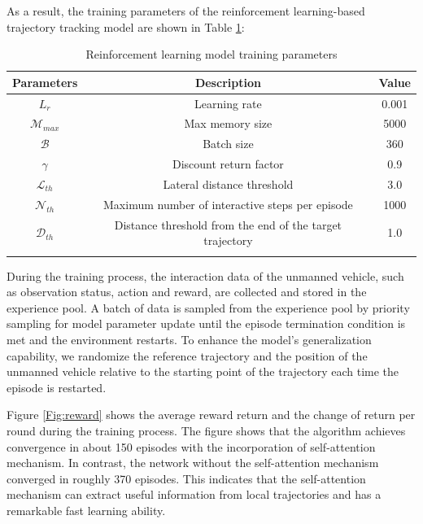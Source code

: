 \documentclass[sn-mathphys]{sn-jnl}%
\theoremstyle{thmstyleone}%
\theoremstyle{thmstyletwo}%
\theoremstyle{thmstylethree}%
\begin{document}
As a result, the training parameters of the reinforcement learning-based trajectory tracking model are shown in Table \ref{tab:train_param}:


\begin{table}[h]
	\begin{center}
		\caption{Reinforcement learning model training parameters}
		\label{tab:train_param}
		\begin{tabular}{ccc}
			\toprule
			Parameters & Description &Value   \\
			\midrule
			$ L_r $  & Learning rate  & 0.001      \\
			$ \mathcal{M}_{max} $ &  Max memory size & 5000           \\
			$ \mathcal{B} $& Batch size & 360      \\
			$ \gamma $& Discount return factor & 0.9      \\
			$\mathcal{L}_{th}$ & Lateral distance threshold & 3.0 \\
			$\mathcal{N}_{th}$ & Maximum number of interactive steps per episode   & 1000 \\
			$\mathcal{D}_{th}$ & Distance threshold from the end of the target trajectory  & 1.0  \\
			\botrule
		\end{tabular}
	\end{center}
\end{table}
During the training process, the interaction data of the unmanned vehicle, such as observation status, action and reward, are collected and stored in the experience pool. A batch of data is sampled from the experience pool by priority sampling for model parameter update until the episode termination condition is met and the environment restarts. To enhance the model's generalization capability, we randomize the reference trajectory and the position of the unmanned vehicle relative to the starting point of the trajectory each time the episode is restarted.

Figure \ref{Fig:reward} shows the average reward return and the change of return per round during the training process. The figure shows that the algorithm achieves convergence in about 150 episodes with the incorporation of self-attention mechanism. In contrast, the network without the self-attention mechanism converged in roughly 370 episodes. This indicates that the self-attention mechanism can extract useful information from local trajectories and has a remarkable fast learning ability.
\end{document}
